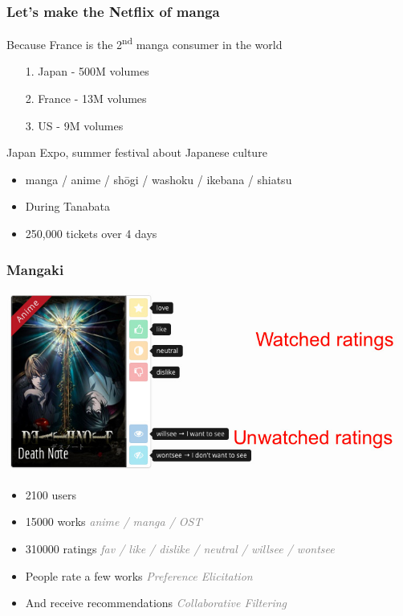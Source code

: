 \documentclass[]{beamer}
\begin{document}
\begin{frame}
  \frametitle{Let's make the Netflix of manga}
  Because France is the 2\textsuperscript{nd} manga consumer in the world

  \begin{itemize}
    \item[1.] Japan - 500M volumes
    \item[2.] France - 13M volumes 
    \item[3.] US - 9M volumes
  \end{itemize}

  \begin{exampleblock}{Japan Expo, summer festival about Japanese culture}
  \begin{itemize}
  \item manga / anime / sh\= ogi / washoku / ikebana / shiatsu
  \item During Tanabata
  \item 250,000 tickets over 4 days
  \end{itemize}
  \vspace{-2mm}
  \end{exampleblock}
  \vspace{2mm}
\end{frame}

\newcommand\discrete[1]{\textcolor{gray}{\hfill {\em \small #1}}}

\begin{frame}
  \frametitle{Mangaki}
    \includegraphics[width=\textwidth]{figures/ratings.jpg}
  \begin{itemize}
  \item 2100 users
  \item 15000 works \discrete{anime / manga / OST}
  \item 310000 ratings \discrete{fav / like / dislike / neutral / willsee / wontsee}
  \item People rate a few works \discrete{Preference Elicitation}
  \item And receive recommendations \discrete{Collaborative Filtering}
  \end{itemize}
\end{frame}
\end{document}
